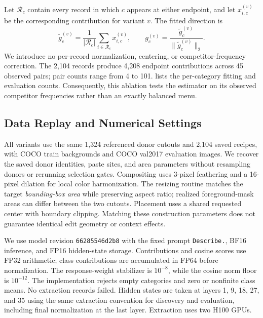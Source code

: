 Let \(\mathcal R_c\) contain every record in which \(c\) appears at
either endpoint, and let \(x_{i,c}^{(v)}\) be the corresponding
contribution for variant \(v\). The fitted direction is
\begin{equation}
    \widetilde g_c^{(v)}=\frac{1}{|\mathcal R_c|}
        \sum_{i\in\mathcal R_c}x_{i,c}^{(v)},\qquad
    g_c^{(v)}=\frac{\widetilde g_c^{(v)}}{
        \|\widetilde g_c^{(v)}\|_2}.
\end{equation}
We introduce no per-record normalization, centering, or
competitor-frequency correction. The 2,104 records produce 4,208 endpoint
contributions across 45 observed pairs; pair counts range from 4 to 101.
 lists the per-category fitting and evaluation
counts. Consequently, this ablation tests the estimator on its observed
competitor frequencies rather than an exactly balanced menu.

\subsection{Data Replay and Numerical Settings}

All variants use the same 1,324 referenced donor cutouts and 2,104 saved
recipes, with COCO train backgrounds and COCO val2017 evaluation images.
We recover the saved donor identities, paste sites, and area parameters
without resampling donors or rerunning selection gates. Compositing uses
3-pixel feathering and a 16-pixel dilation for local color harmonization.
The resizing routine matches the target \emph{bounding-box area} while
preserving aspect ratio; realized foreground-mask areas can differ between
the two cutouts. Placement uses a shared requested center with boundary
clipping. Matching these construction parameters does not guarantee
identical edit geometry or context effects.

We use model revision
\texttt{66285546d2b8}
with the fixed prompt \texttt{Describe.}, BF16 inference, and FP16
hidden-state storage. Contributions and cosine scores use FP32 arithmetic;
class contributions are accumulated in FP64 before normalization.
The response-weight stabilizer is \(10^{-8}\), while the cosine norm
floor is \(10^{-12}\). The implementation rejects empty categories and
zero or nonfinite class means. No extraction records failed.
Hidden states are taken at layers 1, 9, 18, 27, and 35 using the same
extraction convention for discovery and evaluation, including final
normalization at the last layer. Extraction uses two H100 GPUs.


